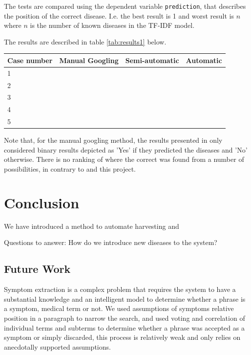 \documentclass[10pt,letterpaper,final]{article}
\begin{document}
The tests are compared using the dependent variable \texttt{prediction},
that describes the position of the correct disease. I.e. the best result
is 1 and worst result is $n$ where $n$ is the number of known diseases
in the TF-IDF model.

The results are described in table \ref{tab:results1} below.
\begin{center}
	\begin{tabular}{llll}
		Case number & Manual Googling & Semi-automatic & Automatic \\ \hline
		1 &  &  &  \\
		2 &  &  &  \\
		3 &  &  &  \\
		4 &  &  &  \\
		5 &  &  &  \\
	\end{tabular}
	\label{tab:results1}
\end{center}
Note that, for the manual googling method, the results presented in
\cite{googlingdiagnosis} only considered binary results depicted as
'Yes' if they predicted the diseases and 'No' otherwise. There is no
ranking of where the correct was found from a number of possibilities,
in contrary to \cite{jensenandersen} and this project.



\section{Conclusion}
\label{chap:conclusion}
We have introduced a method to automate harvesting and 

Questions to answer: How do we introduce new diseases to the system?


\subsection{Future Work}
Symptom extraction is a complex problem that requires the system to have
a substantial knowledge and an intelligent model to determine whether a
phrase is a symptom, medical term or not. We used assumptions of
symptoms relative position in a paragraph to narrow the search, and used
voting and correlation of individual terms and subterms to determine
whether a phrase was accepted as a symptom or simply discarded, this
process is relatively weak and only relies on anecdotally supported
assumptions.
\end{document}
